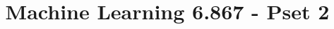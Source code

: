 \documentclass[twoside,11pt]{article}
\begin{document}
\title{Machine Learning 6.867 - Pset 2}

\maketitle



\end{document}
